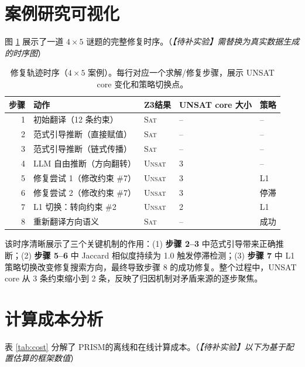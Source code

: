 \documentclass[UTF8,a4paper,12pt]{ctexart}
\newcommand{\PRISM}{PRISM}
\newcommand{\sat}{\textsc{Sat}}
\newcommand{\unsat}{\textsc{Unsat}}
\newcommand{\zthree}{Z3}
\begin{document}
\section{案例研究可视化}

图 \ref{fig:repair-timeline} 展示了一道 \(4\times5\) 谜题的完整修复时序。（\textit{【待补实验】需替换为真实数据生成的时序图}）

\begin{table}[h]
  \centering
  \caption{修复轨迹时序（\(4\times5\) 案例）。每行对应一个求解/修复步骤，展示 UNSAT core 变化和策略切换点。}
  \label{fig:repair-timeline}
  \small
  \begin{tabular}{rllll}
    \toprule
    步骤 & 动作 & \zthree 结果 & UNSAT core 大小 & 策略 \\
    \midrule
    1 & 初始翻译（12 条约束） & \sat & -- & -- \\
    2 & 范式引导推断（直接赋值） & \sat & -- & -- \\
    3 & 范式引导推断（链式传播） & \sat & -- & -- \\
    4 & LLM 自由推断（方向翻转） & \unsat & 3 & -- \\
    5 & 修复尝试 1（修改约束 \#7） & \unsat & 3 & L1 \\
    6 & 修复尝试 2（修改约束 \#7） & \unsat & 3 & 停滞 \\
    7 & L1 切换：转向约束 \#2 & \unsat & 2 & L1 \\
    8 & 重新翻译方向语义 & \sat & -- & 成功 \\
    \bottomrule
  \end{tabular}
\end{table}

该时序清晰展示了三个关键机制的作用：(1) \textbf{步骤 2--3} 中范式引导带来正确推断；(2) \textbf{步骤 5--6} 中 Jaccard 相似度持续为 1.0 触发停滞检测；(3) \textbf{步骤 7} 中 L1 策略切换改变修复搜索方向，最终导致步骤 8 的成功修复。整个过程中，UNSAT core 从 3 条约束缩小到 2 条，反映了归因机制对矛盾来源的逐步聚焦。

\section{计算成本分析}

表 \ref{tab:cost} 分解了 \PRISM 的离线和在线计算成本。（\textit{【待补实验】以下为基于配置估算的框架数值}）
\end{document}
